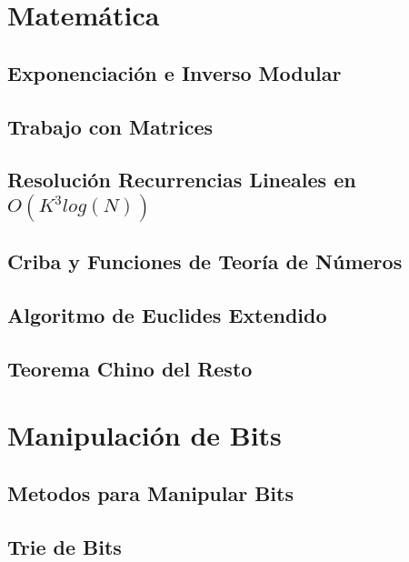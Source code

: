 \section{Matem\'atica}
\subsection{Exponenciaci\'on e Inverso Modular}
\raggedbottom
\hrulefill
\subsection{Trabajo con Matrices}
\raggedbottom
\hrulefill
\subsection{Resoluci\'on Recurrencias Lineales en $O(K^3log(N))$}
\raggedbottom
\hrulefill
\subsection{Criba y Funciones de Teor\'ia de N\'umeros}
\raggedbottom
\hrulefill
\subsection{Algoritmo de Euclides Extendido}
\raggedbottom
\hrulefill
\subsection{Teorema Chino del Resto}
\raggedbottom
\hrulefill

\section{Manipulaci\'on de Bits}
\subsection{Metodos para Manipular Bits}
\raggedbottom
\hrulefill
\subsection{Trie de Bits}
\raggedbottom
\hrulefill

